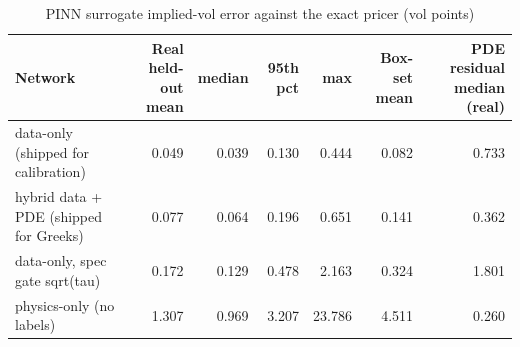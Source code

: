 \begin{table}[ht]
\centering
\small
\caption{PINN surrogate implied-vol error against the exact pricer (vol points)}
\begin{tabular}{lrrrrrr}
\toprule
Network & Real held-out mean & median & 95th pct & max & Box-set mean & PDE residual median (real) \\
\midrule
data-only (shipped for calibration) & 0.049 & 0.039 & 0.130 & 0.444 & 0.082 & 0.733 \\
hybrid data + PDE (shipped for Greeks) & 0.077 & 0.064 & 0.196 & 0.651 & 0.141 & 0.362 \\
data-only, spec gate sqrt(tau) & 0.172 & 0.129 & 0.478 & 2.163 & 0.324 & 1.801 \\
physics-only (no labels) & 1.307 & 0.969 & 3.207 & 23.786 & 4.511 & 0.260 \\
\bottomrule
\end{tabular}
\par{}
\end{table}
